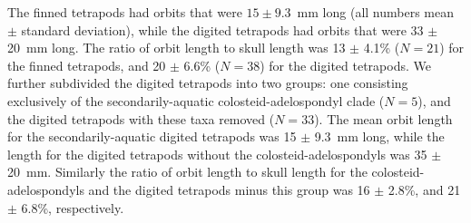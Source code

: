  The finned tetrapods had orbits that were $15 \pm 9.3$~mm long (all numbers mean $\pm$ standard deviation), while the digited tetrapods had orbits that were 33 $\pm$ 20~mm long. The ratio of orbit length to skull length was 13 $\pm$ 4.1\% ($N=21$) for the finned tetrapods, and 20 $\pm$  6.6\% ($N=38$) for the digited tetrapods. We further subdivided the digited tetrapods into two groups: one consisting exclusively of the secondarily-aquatic colosteid-adelospondyl clade ($N=5$), and the digited tetrapods with these taxa removed ($N=33$). The mean orbit length for the secondarily-aquatic digited tetrapods was 15 $\pm$ 9.3~mm long, while the length for the digited tetrapods without the colosteid-adelospondyls was 35 $\pm$ 20~mm. Similarly the ratio of orbit length to skull length for the colosteid-adelospondyls and the digited tetrapods minus this group was 16 $\pm$ 2.8\%, and 21 $\pm$ 6.8\%, respectively.